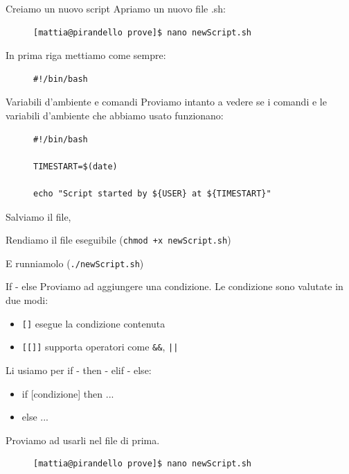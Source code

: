 \begin{frame}[fragile]{Creiamo un nuovo script}
  Apriamo un nuovo file .sh:
  \begin{figure}
    \begin{lstlisting}
[mattia@pirandello prove]$ nano newScript.sh
\end{lstlisting}
  \end{figure}

  In prima riga mettiamo come sempre: 
  \begin{figure}
    \begin{lstlisting}[backgroundcolor=\color{expowhite!50!white}]
#!/bin/bash
\end{lstlisting}
  \end{figure}
\end{frame}

\begin{frame}[fragile]{Variabili d'ambiente e comandi}
  Proviamo intanto a vedere se i comandi e le variabili d'ambiente che abbiamo usato funzionano: 
  \begin{figure}
    \begin{lstlisting}[backgroundcolor=\color{expowhite!50!white}]
#!/bin/bash

TIMESTART=$(date)

echo "Script started by ${USER} at ${TIMESTART}"
\end{lstlisting}
  \end{figure}

  Salviamo il file, 
  
  Rendiamo il file eseguibile (\texttt{chmod +x newScript.sh})
  
  E runniamolo (\texttt{./newScript.sh})
\end{frame}

\begin{frame}[fragile]{If - else}
  Proviamo ad aggiungere una condizione. Le condizione sono valutate in due modi:
  \begin{itemize}
    \item \texttt{[]} esegue la condizione contenuta
    \item \texttt{[[]]} supporta operatori come \texttt{\&\&}, \texttt{||} 
  \end{itemize}

  Li usiamo per if - then - elif - else:

  \begin{itemize}
    \item if [condizione] then ...
    \item else ...
  \end{itemize}
  Proviamo ad usarli nel file di prima.

  \begin{figure}
    \begin{lstlisting}
[mattia@pirandello prove]$ nano newScript.sh
    \end{lstlisting}
  \end{figure}
\end{frame}

